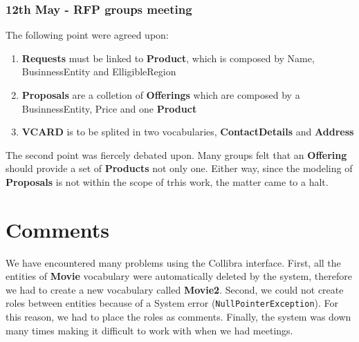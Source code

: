 \documentclass[a4paper,10pt]{article}
\begin{document}
\subsubsection*{12th May - RFP groups meeting}
The following point were agreed upon:
\begin{enumerate}
  \item \textbf{Requests} must be linked to \textbf{Product}, which is composed by Name, BusinnessEntity and ElligibleRegion
  \item \textbf{Proposals} are a colletion of \textbf{Offerings} which are composed by a BusinnessEntity, Price and one \textbf{Product}
  \item \textbf{VCARD} is to be splited in two vocabularies, \textbf{ContactDetails} and \textbf{Address}
\end{enumerate}
The second point was fiercely debated upon. Many groups felt that an \textbf{Offering} should provide a set of \textbf{Products} not only one. Either way, since the modeling of \textbf{Proposals} is not within the scope of trhis work, the matter came to a halt.


\section{Comments}
We have encountered many problems using the Collibra interface. First, all the entities of \textbf{Movie} vocabulary were automatically deleted by the system, therefore we had to create a new vocabulary called \textbf{Movie2}. Second, we could not create roles between entities because of a System error (\verb+NullPointerException+). For this reason, we had to place the roles as comments. Finally, the system was down many times making it difficult to work with when we had meetings. 
\end{document}
